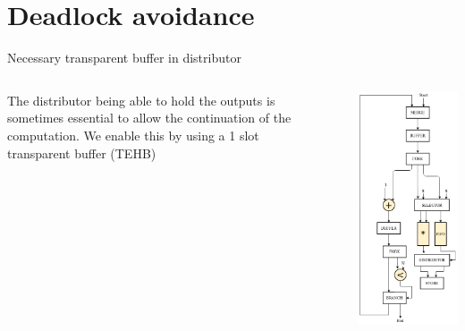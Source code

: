 \documentclass{beamer}
\begin{document}
\section{Deadlock avoidance}
\begin{frame}{Necessary transparent buffer in distributor}
    \begin{columns}[T]
    \begin{column}{0.45\textwidth}
    The distributor being able to hold the outputs is sometimes essential to allow the continuation of the computation. We enable this by using a 1 slot transparent buffer (TEHB)
    \end{column}
    \begin{column}{0.1\textwidth}
    \end{column}
    \begin{column}{0.45\textwidth}
      \includegraphics[scale=0.28]{shared_base_case.png}
    \end{column}
  \end{columns}
\end{frame}
\end{document}
